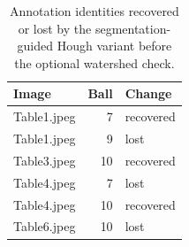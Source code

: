 \begin{table}[htbp]
\centering
\small
\caption{Annotation identities recovered or lost by the segmentation-guided Hough variant before the optional watershed check.}
\label{tab:segmentation-hough-changes}
\begin{tabular}{lrl}
\toprule
Image & Ball & Change \\
\midrule
Table1.jpeg & 7 & recovered \\
Table1.jpeg & 9 & lost \\
Table3.jpeg & 10 & recovered \\
Table4.jpeg & 7 & lost \\
Table4.jpeg & 10 & recovered \\
Table6.jpeg & 10 & lost \\
\bottomrule
\end{tabular}
\end{table}
\FloatBarrier
